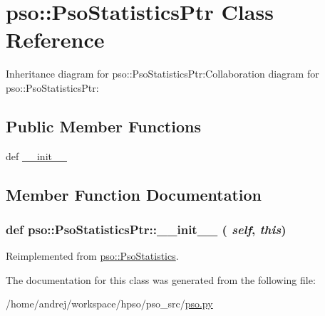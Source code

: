 \hypertarget{classpso_1_1PsoStatisticsPtr}{
\section{pso::PsoStatisticsPtr Class Reference}
\label{classpso_1_1PsoStatisticsPtr}
}
Inheritance diagram for pso::PsoStatisticsPtr:Collaboration diagram for pso::PsoStatisticsPtr:\subsection*{Public Member Functions}
\begin{CompactItemize}
\item 
def \hyperlink{classpso_1_1PsoStatisticsPtr_340c20923b9f481d88185dc3977364aa}{\_\-\_\-init\_\-\_\-}
\end{CompactItemize}


\subsection{Member Function Documentation}
\hypertarget{classpso_1_1PsoStatisticsPtr_340c20923b9f481d88185dc3977364aa}{
\subsubsection{\setlength{\rightskip}{0pt plus 5cm}def pso::PsoStatisticsPtr::\_\-\_\-init\_\-\_\- ( {\em self}, \/   {\em this})}}
\label{classpso_1_1PsoStatisticsPtr_340c20923b9f481d88185dc3977364aa}




Reimplemented from \hyperlink{classpso_1_1PsoStatistics_5ebd13cc8e53e3db6b09d161d72f7238}{pso::PsoStatistics}.

The documentation for this class was generated from the following file:\begin{CompactItemize}
\item 
/home/andrej/workspace/hpso/pso\_\-src/\hyperlink{pso_8py}{pso.py}\end{CompactItemize}
